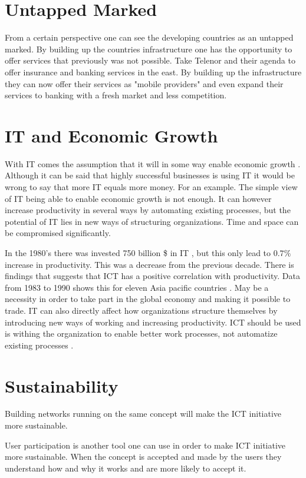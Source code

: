 \section{Untapped Marked}
From a certain perspective one can see the developing countries as an untapped marked.
By building up the countries infrastructure one has the opportunity to offer services that previously was not possible.
Take Telenor and their agenda to offer insurance and banking services in the east.
By building up the infrastructure they can now offer their services as "mobile providers" and even expand their services to banking with a fresh market and less competition.

\section{IT and Economic Growth}
With IT comes the assumption that it will in some way enable economic growth \cite{ca:ieeg}.
Although it can be said that highly successful businesses is using IT it would be wrong to say that more IT equals more money.
For an example.
The simple view of IT being able to enable economic growth is not enough.
It can however increase productivity in several ways by automating existing processes, but the potential of IT lies in new ways of structuring organizations.
Time and space can be compromised significantly.

In the 1980's there was invested 750 billion \$ in IT \cite{ca:ieeg}, but this only lead to \(0.7\%\) increase in productivity. This was a decrease from the previous decade.
There is findings that suggests that ICT has a positive correlation with productivity. Data from 1983 to 1990 shows this for eleven Asia pacific countries \cite{ca:ieeg}. May be a necessity in order to take part in the global economy and making it possible to trade. IT can also directly affect how organizations structure themselves by introducing new ways of working and increasing productivity.
ICT should be used is withing the organization to enable better work processes, not automatize existing processes \cite{mh:rw}. 

\section{Sustainability\cite{jbemss:noa}}

Building networks running on the same concept will make the ICT initiative more sustainable. 

User participation is another tool one can use in order to make ICT initiative more sustainable.
When the concept is accepted and made by the users they understand how and why it works and are more likely to accept it.
